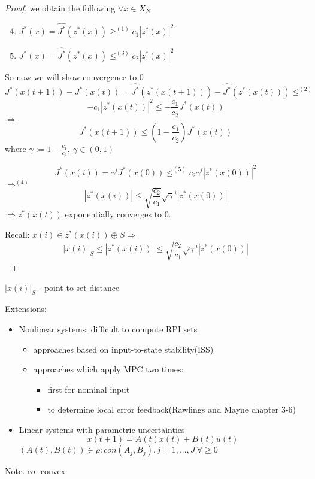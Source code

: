 \begin{Theorem}
\begin{proof}
we obtain the following $\forall x \in X_N$
\begin{enumerate}
\setcounter{enumi}{3}
\item $J^*(x) = \hat{J^*}(z^*(x)) \geq^{(1)} c_1|z^*(x)|^2$
\item $J^*(x) = \hat{J^*}(z^*(x)) \leq^{(3)} c_2|z^*(x)|^2$
\end{enumerate}

So now we will show convergence to $0$
\begin{equation*}
J^*(x(t+1)) - J^*(x(t)) = \hat{J^*}(z^*(x(t+1))) - \hat{J^*}(z^*(x(t))) \leq^{(2)}
\end{equation*}
\begin{equation*}
-c_1|z^*(x(t))|^2 \leq - \frac{c_1}{c_2}J^*(x(t))
\end{equation*}
$\Rightarrow$
\begin{equation*}
J^*(x(t+1)) \leq (1 - \frac{c_1}{c_2})J^*(x(t))
\end{equation*} 
where $\gamma := 1 - \frac{c_1}{c_2}, \ \gamma \in (0,1)$

\begin{equation*}
J^*(x(i)) = \gamma^iJ^*(x(0)) \leq^{(5)} c_2\gamma^i|z^*(x(0))|^2
\end{equation*}
$\Rightarrow^{(4)}$
\begin{equation*}
|z^*(x(i))| \leq \sqrt{\frac{c_2}{c_1}}\sqrt{\gamma}^i|z^*(x(0))|
\end{equation*}
$\Rightarrow z^*(x(t))$ exponentially converges to $0$.

Recall: $x(i) \in z^*(x(i)) \oplus S \Rightarrow$
\begin{equation*}
|x(i)|_S \leq |z^*(x(i))| \leq \sqrt{\frac{c_2}{c_1}}\sqrt{\gamma}^i|z^*(x(0))|
\end{equation*}
\end{proof}
\end{Theorem}

$|x(i)|_S$ - point-to-set distance

Extensions:
\begin{itemize}
\item Nonlinear systems: difficult to compute RPI sets
\begin{itemize}
\item approaches based on input-to-state stability(ISS)
\item approaches which apply MPC two times:
\begin{itemize}
\item first for nominal input
\item to determine local error feedback(Rawlings and Mayne chapter 3-6)
\end{itemize}
\end{itemize}
\item Linear systems with parametric uncertainties
\begin{equation*}
x(t+1) = A(t)x(t) + B(t)u(t)
\end{equation*}
$(A(t),B(t)) \in \rho : con{(A_j,B_j), j = 1,...,J} \ \forall \geq 0$ 
\end{itemize}
Note. $co$- convex

